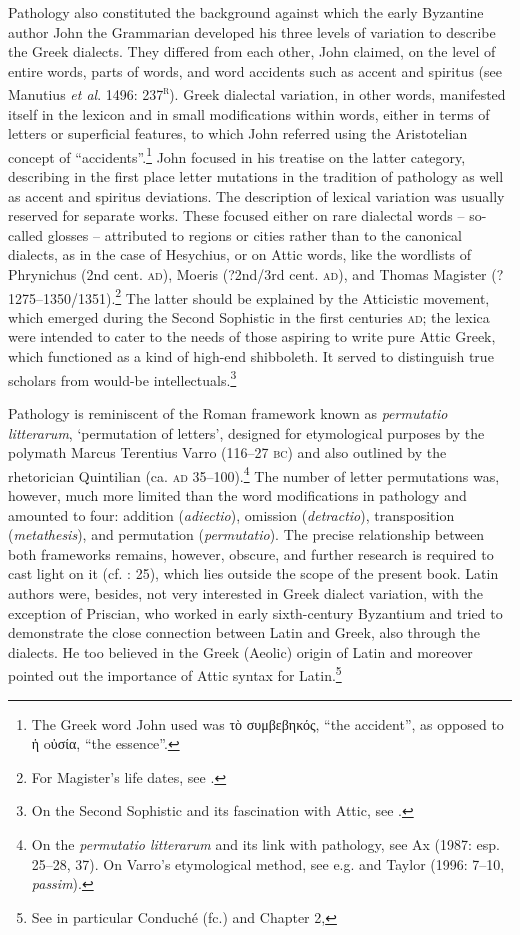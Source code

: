 Pathology also constituted the background against which the early Byzantine author John the Grammarian developed his three levels of variation to describe the Greek dialects. They differed from each other, John claimed, on the level of entire words, parts of words, and word accidents such as accent and spiritus (see Manutius \textit{et al}. 1496: 237\textsc{\textsuperscript{r}}). Greek dialectal variation, in other words, manifested itself in the lexicon and in small modifications within words, either in terms of letters or superficial features, to which John referred using the Aristotelian concept of “accidents”.\footnote{The Greek word John used was τὸ συμβεβηκός, “the accident”, as opposed to ἡ oὐσία, “the essence”.} John focused in his treatise on the latter category, describing in the first place letter mutations in the tradition of pathology as well as accent and spiritus deviations. The description of lexical variation was usually reserved for separate works. These focused either on rare dialectal words – so-called glosses – attributed to regions or cities rather than to the canonical dialects, as in the case of Hesychius, or on Attic words, like the wordlists of Phrynichus (2nd cent. \textsc{ad}), Moeris (?2nd/3rd cent. \textsc{ad}), and Thomas Magister (?1275–1350/1351).\footnote{{For Magister’s life dates, see \citet[417]{Baloglou1998}.}} The latter should be explained by the Atticistic movement, which emerged during the Second Sophistic in the first centuries \textsc{ad}; the lexica were intended to cater to the needs of those aspiring to write pure Attic Greek, which functioned as a kind of high-end shibboleth. It served to distinguish true scholars from would-be intellectuals.\footnote{On the Second Sophistic and its fascination with Attic, see \citet{Whitmarsh2005}.}



Pathology is reminiscent of the Roman framework known as \textit{permutatio litterarum}, ‘permutation of letters’, designed for etymological purposes by the polymath Marcus Terentius Varro (116–27 \textsc{bc}) and also outlined by the rhetorician Quintilian (ca. \textsc{ad} 35–100).\footnote{{On the} {\textit{permutatio litterarum} }{and its link with pathology, see Ax (1987: esp. 25–28, 37). On Varro’s etymological method, see e.g. \citet{Pfaffel1981} and Taylor (1996: 7–10,} {\textit{passim}}).} The number of letter permutations was, however, much more limited than the word modifications in pathology and amounted to four: addition (\textit{adiectio}), omission (\textit{detractio}), transposition (\textit{metathesis}), and permutation (\textit{permutatio}). The precise relationship between both frameworks remains, however, obscure, and further research is required to cast light on it (cf. \citealt{Ax1987}: 25), which lies outside the scope of the present book. Latin authors were, besides, not very interested in Greek dialect variation, with the exception of Priscian, who worked in early sixth-century Byzantium and tried to demonstrate the close connection between Latin and Greek, also through the dialects. He too believed in the Greek (Aeolic) origin of Latin and moreover pointed out the importance of Attic syntax for Latin.\footnote{{See in particular Conduché (fc.) and Chapter 2, }}


